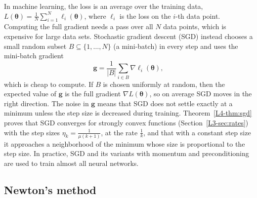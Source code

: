 \begin{remark}\label{L3-rem:sgd}
    In machine learning, the loss is an average over the training data, $L(\boldsymbol{\theta}) = \frac{1}{N}\sum_{i=1}^N \ell_i(\boldsymbol{\theta})$, where $\ell_i$ is the loss on the $i$-th data point. Computing the full gradient needs a pass over all $N$ data points, which is expensive for large data sets. Stochastic gradient descent (SGD) instead chooses a small random subset $B \subseteq \{1, \ldots, N\}$ (a mini-batch) in every step and uses the mini-batch gradient
    \[\mathbf{g} = \frac{1}{|B|}\sum_{i \in B} \nabla\ell_i(\boldsymbol{\theta}),\]
    which is cheap to compute. If $B$ is chosen uniformly at random, then the expected value of $\mathbf{g}$ is the full gradient $\nabla L(\boldsymbol{\theta})$, so on average SGD moves in the right direction. The noise in $\mathbf{g}$ means that SGD does not settle exactly at a minimum unless the step size is decreased during training. Theorem~\ref{L4-thm:sgd} proves that SGD converges for strongly convex functions (Section~\ref{L3-sec:rates}) with the step sizes $\eta_k = \frac{1}{\mu(k + 1)}$, at the rate $\frac{1}{k}$, and that with a constant step size it approaches a neighborhood of the minimum whose size is proportional to the step size. In practice, SGD and its variants with momentum and preconditioning are used to train almost all neural networks.
\end{remark}

\subsection{Newton's method}\label{L3-sec:newton}

